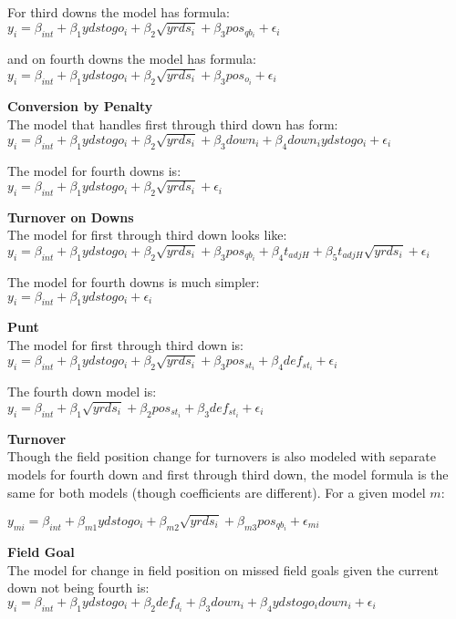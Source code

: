 \documentclass[12pt,twoside]{dukestatscithesis}
\begin{document}
For third downs the model has formula:\\
\(y_{i} = \beta_{int} + \beta_{1}ydstogo_i + \beta_{2}\sqrt{yrds_i} + \beta_{3}pos_{qb_i} + \epsilon_i\)

and on fourth downs the model has formula:\\
\(y_{i} = \beta_{int} + \beta_{1}ydstogo_i + \beta_{2}\sqrt{yrds_i} + \beta_{3}pos_{o_i} + \epsilon_i\)

\textbf{Conversion by Penalty}\\
The model that handles first through third down has form:\\
\(y_{i} = \beta_{int} + \beta_{1}ydstogo_i + \beta_{2}\sqrt{yrds_i} + \beta_{3}down_i + \beta_{4}down_iydstogo_i + \epsilon_i\)

The model for fourth downs is:\\
\(y_{i} = \beta_{int} + \beta_{1}ydstogo_i + \beta_{2}\sqrt{yrds_i} + \epsilon_i\)

\textbf{Turnover on Downs}\\
The model for first through third down looks like:\\
\(y_{i} = \beta_{int} + \beta_{1}ydstogo_i + \beta_{2}\sqrt{yrds_i} + \beta_{3}pos_{qb_i} + \beta_{4}t_{adjH} + \beta_{5}t_{adjH}\sqrt{yrds_i} + \epsilon_i\)

The model for fourth downs is much simpler:\\
\(y_{i} = \beta_{int} + \beta_{1}ydstogo_i + \epsilon_i\)

\textbf{Punt}\\
The model for first through third down is:\\
\(y_{i} = \beta_{int} + \beta_{1}ydstogo_i + \beta_{2}\sqrt{yrds_i} + \beta_{3}pos_{st_i} + \beta_{4}def_{st_i} + \epsilon_i\)

The fourth down model is:\\
\(y_{i} = \beta_{int} + \beta_{1}\sqrt{yrds_i} + \beta_{2}pos_{st_i} + \beta_{3}def_{st_i} + \epsilon_i\)

\textbf{Turnover}\\
Though the field position change for turnovers is also modeled with separate models for fourth down and first through third down, the model formula is the same for both models (though coefficients are different). For a given model \(m\):

\(y_{mi} = \beta_{int} + \beta_{m1}ydstogo_i + \beta_{m2}\sqrt{yrds_i} + \beta_{m3}pos_{qb_i} + \epsilon_{mi}\)

\textbf{Field Goal}\\
The model for change in field position on missed field goals given the current down not being fourth is:\\
\(y_{i} = \beta_{int} + \beta_{1}ydstogo_i + \beta_{2}def_{d_i} + \beta_{3}down_i + \beta_{4}ydstogo_idown_i + \epsilon_{i}\)
\end{document}
